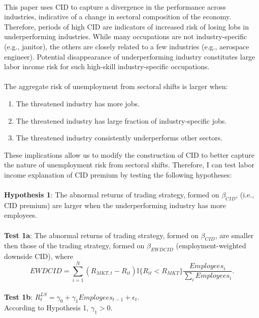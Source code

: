 \documentclass[12pt]{article}
\begin{document}
\paragraph{}
This paper uses CID to capture a divergence in the performance across industries, indicative of a change in sectoral composition of the economy. Therefore, periods of high CID are indicators of increased risk of losing lobs in underperforming industries. While many occupations are not industry-specific (e.g., janitor), the others are closely related to a few industries (e.g., aerospace engineer). Potential disappearance of underperforming industry constitutes large labor income risk for such high-skill industry-specific occupations. \paragraph{}
The aggregate risk of unemployment from sectoral shifts is larger when:
\begin{enumerate}
    \item {The threatened industry has more jobs.}
    \item {The threatened industry has large fraction of industry-specific jobs.}
    \item {The threatened industry consistently underperforms other sectors.}
\end{enumerate}
These implications allow us to modify the construction of CID to better capture the nature of unemployment risk from sectoral shifts. Therefore, I can test labor income explanation of CID premium by testing the following hypotheses:
\paragraph{}
\textbf{Hypothesis 1}: The abnormal returns of trading strategy, formed on $\beta_{CID}$, (i.e., CID premium) are larger when the underperforming industry has more employees.
\paragraph{}
\textbf{Test 1a}: The abnormal returns of trading strategy, formed on $\beta_{CID}$, are smaller then those of the trading strategy, formed on $\beta_{EWDCID}$ (employment-weighted downside CID), where $$EWDCID = \sum^{N}_{i=1}{(R_{MKT,t}-R_{it}) \mathbb{I}\{R_{it}<R_{MKT}\} \frac{Employees_i}{\sum_{i} Employees_i} }.$$
\\ \-\hspace{0.3cm}
\textbf{Test 1b}: $R^{LS}_{t} = \gamma_0 +\gamma_1 Employees_{t-1}+\epsilon_t$. \\ 
According to Hypothesis 1, $\gamma_1>0$.
\end{document}
